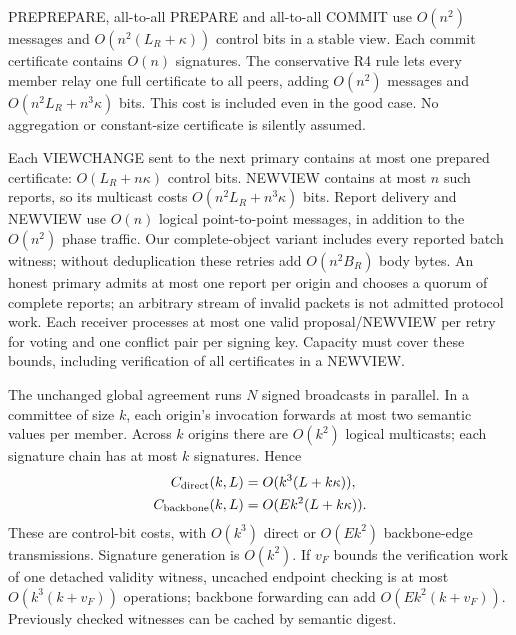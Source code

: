 \documentclass[11pt,a4paper,onecolumn]{article}
\theoremstyle{remark}\newtheorem{example}[definition]{Example}
\newcounter{protocol}
\begin{document}
PREPREPARE, all-to-all PREPARE and all-to-all COMMIT use $O(n^2)$ messages and
$O(n^2(L_R+\kappa))$ control bits in a stable view. Each commit certificate
contains $O(n)$ signatures. The conservative R4 rule lets every member relay
one full certificate to all peers, adding $O(n^2)$ messages and
$O(n^2L_R+n^3\kappa)$ bits. This cost is included even in the good case.
No aggregation or constant-size certificate is silently assumed.

Each VIEWCHANGE sent to the next primary contains at most one prepared
certificate: $O(L_R+n\kappa)$ control bits. NEWVIEW contains at most $n$ such
reports, so its multicast costs $O(n^2L_R+n^3\kappa)$ bits. Report delivery and
NEWVIEW use $O(n)$ logical point-to-point messages, in addition to the
$O(n^2)$ phase traffic. Our complete-object variant includes every reported
batch witness; without deduplication these retries add $O(n^2B_R)$ body bytes.
An honest primary admits at most one report per origin and chooses a quorum
of complete reports; an arbitrary stream of invalid packets is not admitted
protocol work. Each receiver processes at most one valid proposal/NEWVIEW per
retry for voting and one conflict pair per signing key. Capacity must cover
these bounds, including verification of all certificates in a NEWVIEW.

The unchanged global agreement runs $N$ signed broadcasts in parallel. In a
committee of size $k$, each origin's invocation forwards at most two semantic
values per member. Across $k$ origins there are $O(k^2)$ logical multicasts;
each signature chain has at most $k$ signatures. Hence
\begin{align}
 C_{\rm direct}(k,L)&=O(k^3(L+k\kappa)),\label{eq:directcost}\\
 C_{\rm backbone}(k,L)&=O(Ek^2(L+k\kappa)).\label{eq:backbonecost}
\end{align}
These are control-bit costs, with $O(k^3)$ direct or $O(Ek^2)$ backbone-edge
transmissions. Signature generation is $O(k^2)$. If $v_F$ bounds the verification
work of one detached validity witness, uncached endpoint checking is at most
$O(k^3(k+v_F))$ operations; backbone forwarding can add
$O(Ek^2(k+v_F))$. Previously checked witnesses can be cached by semantic digest.
\end{document}
